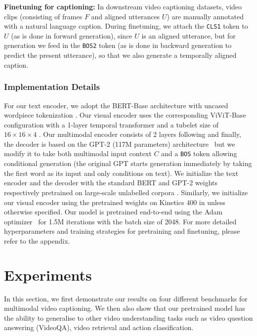 \documentclass[10pt,twocolumn,letterpaper]{article}
\begin{document}
\noindent\textbf{Finetuning for captioning:}
In downstream video captioning datasets, video clips (consisting of frames $F$ and aligned utterances $U$) are manually annotated with a natural language caption.
During finetuning, we attach the \texttt{CLS1} token to $U$ (as is done in forward generation), since $U$ is an aligned utterance, but for generation we feed in the \texttt{BOS2} token (as is done in backward generation to predict the present utterance), so that we also generate a temporally aligned caption.
\vspace{-0.05\baselineskip}  



\subsubsection{Implementation Details}

For our text encoder, we adopt the BERT-Base architecture with uncased wordpiece tokenization \cite{devlin2018bert}.
Our visual encoder uses the corresponding ViViT-Base configuration with a 1-layer temporal transformer and a tubelet size of $16\times16\times4$ \cite{arnab2021vivit}.
Our multimodal encoder consists of 2 layers following \cite{seo2021look} and finally, the decoder is based on the GPT-2 (117M parameters) architecture~\cite{radford2019language} but we modify it to take both multimodal input context $C$ and a \texttt{BOS} token allowing conditional generation (the original GPT starts generation immediately by taking the first word as its input and only conditions on text).
We initialize the text encoder and the decoder with the standard BERT and GPT-2 weights respectively pretrained on large-scale unlabelled corpora \cite{devlin2018bert,radford2019language}.
Similarly, we initialize our visual encoder using the pretrained weights on Kinetics 400 in \cite{arnab2021vivit} unless otherwise specified. Our model is pretrained end-to-end using the Adam optimizer~\cite{kingma2014adam} for 1.5M iterations with the batch size of 2048.
For more detailed hyperparameters and training strategies for pretraining and finetuning, please refer to the appendix.
 \section{Experiments}
In this section, we first demonstrate our results on four different benchmarks for multimodal video captioning. We then also show that our pretrained model has the ability to generalise to other video understanding tasks such as video question answering (VideoQA), video retrieval and action classification.
\end{document}
